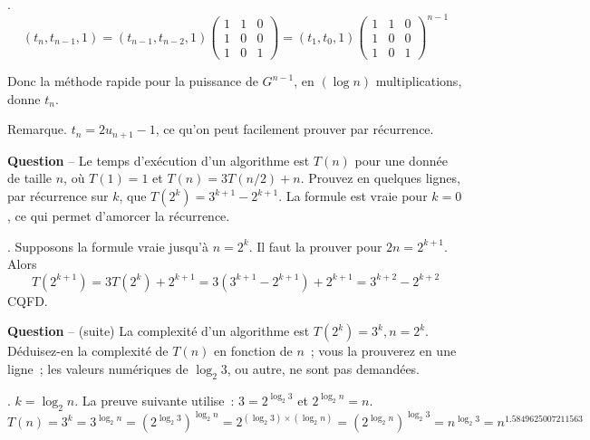 \documentclass[12pt]{article}
\newcounter{QNumber}
\newcommand{\Question}[2][ ]{
 \stepcounter{QNumber}
  \noindent\textbf{Question \theQNumber} --
  #2~#1}
\begin{document}
.
$$(t_n, t_{n-1}, 1)=(t_{n-1},t_{n-2},1)\left( \begin{array}{ccc} 1 & 1 & 0 \\
1 & 0 & 0 \\
1 & 0 & 1 \end{array}\right)=(t_{1}, t_0, 1) \left( \begin{array}{ccc} 1 & 1 & 0 \\
1 & 0 & 0 \\
1 & 0 & 1 \end{array}\right)^{n-1}$$

Donc la méthode rapide pour la puissance de $G^{n-1}$, en $(\log n)$ multiplications, donne $t_n$.

Remarque. $t_n= 2u_{n+1}-1$, ce qu'on peut facilement prouver par récurrence.

\Question{Le temps d'ex\'ecution d'un algorithme  est
$T(n)$ pour une donn\'ee de taille $n$, o\`u $T(1)=1$ et $T(n)=3 T(n/2)+n$.
Prouvez en quelques lignes, par r\'ecurrence sur $k$, que $T(2^k) = 3^{k+1}-2^{k+1}$.
La formule est vraie pour $k=0$, ce qui permet d'amorcer la récurrence.}

. Supposons la formule vraie jusqu'à $n=2^k$. 
Il faut la prouver pour $2n=2 ^ {k+1}$. Alors
$$T(2^{k+1})= 3 T(2^k)+2^{k+1}= 3 (3^{k+1}-2^{k+1}) + 2^{k+1}=3^{k+2} - 2^{k+2}$$ CQFD.

\Question{(suite) La complexité d'un algorithme est $T(2^k) = 3^{k}, n=2^k$. 
Déduisez-en la complexité de $T(n)$ en fonction de $n$~; vous la prouverez en une ligne~; les valeurs numériques de $\log_2 3$, ou autre, ne sont pas demandées. 
}

. $k=\log_2 n$. La preuve suivante utilise~: $3=2 ^ {\log_2 3}$ et $ 2 ^ {\log_2 n}=n$.
$$T(n)=3^k = 3 ^{\log_2 n} = \left( 2 ^ {\log_2 3} \right) ^{\log_2 n} 
= 2^{(\log_2 3)\times (\log_2 n)} =  \left( 2 ^ {\log_2 n} \right) ^{\log_2 3}=n ^ {\log_2 3}= n^ {1.5849625007211563}$$

\end{document}
